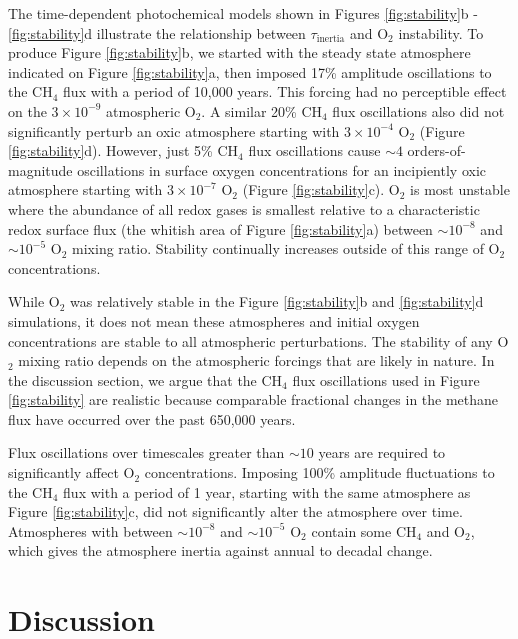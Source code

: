 The time-dependent photochemical models shown in Figures \ref{fig:stability}b - \ref{fig:stability}d illustrate the relationship between $\tau_\mathrm{inertia}$ and  O$_2$ instability. To produce Figure \ref{fig:stability}b, we started with the steady state atmosphere indicated on Figure \ref{fig:stability}a, then imposed 17\% amplitude oscillations to the CH$_4$ flux with a period of 10,000 years. This forcing had no perceptible effect on the $3 \times 10^{-9}$ atmospheric O$_2$. A similar 20\% CH$_4$ flux oscillations also did not significantly perturb an oxic atmosphere starting with $3 \times 10^{-4}$ O$_2$ (Figure \ref{fig:stability}d). However, just 5\% CH$_4$ flux oscillations cause $\sim4$ orders-of-magnitude oscillations in surface oxygen concentrations for an incipiently oxic atmosphere starting with $3 \times 10^{-7}$ O$_2$ (Figure \ref{fig:stability}c). O$_2$ is most unstable where the abundance of all redox gases is smallest relative to a characteristic redox surface flux (the whitish area of Figure \ref{fig:stability}a) between $\sim10^{-8}$ and $\sim10^{-5}$ O$_2$ mixing ratio. Stability continually increases outside of this range of O$_2$ concentrations.

While O$_2$ was relatively stable in the Figure \ref{fig:stability}b and \ref{fig:stability}d simulations, it does not mean these atmospheres and initial oxygen concentrations are stable to all atmospheric perturbations. The stability of any O$_2$ mixing ratio depends on the atmospheric forcings that are likely in nature. In the discussion section, we argue that the CH$_4$ flux oscillations used in Figure \ref{fig:stability} are realistic because comparable fractional changes in the methane flux have occurred over the past 650,000 years.

Flux oscillations over timescales greater than $\sim10$ years are required to significantly affect O$_2$ concentrations. Imposing 100\% amplitude fluctuations to the CH$_4$ flux with a period of 1 year, starting with the same atmosphere as Figure \ref{fig:stability}c, did not significantly alter the atmosphere over time. Atmospheres with between $\sim10^{-8}$ and $\sim10^{-5}$ O$_2$ contain some CH$_4$ and O$_2$, which gives the atmosphere inertia against annual to decadal change.

\section{Discussion} \label{sec:dis}

